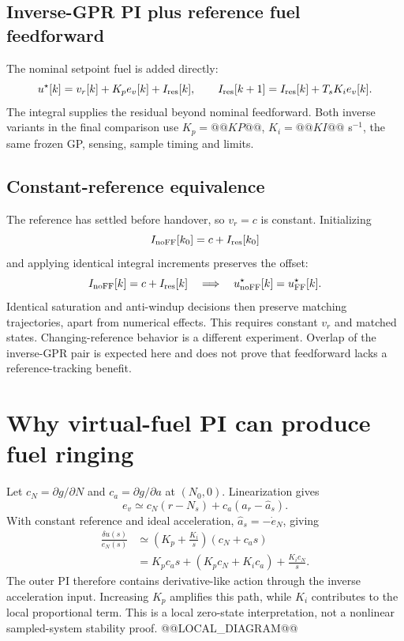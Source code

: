 \subsection{Inverse-GPR PI plus reference fuel feedforward}
The nominal setpoint fuel is added directly:
\begin{equation}
u^\star[k]=v_r[k]+K_pe_v[k]+I_{\rm res}[k],\qquad
I_{\rm res}[k+1]=I_{\rm res}[k]+T_sK_ie_v[k].
\label{eq:invff}
\end{equation}
The integral supplies the residual beyond nominal feedforward. Both inverse variants in the final comparison use $K_p=@@KP@@$, $K_i=@@KI@@$ s$^{-1}$, the same frozen GP, sensing, sample timing and limits.

\subsection{Constant-reference equivalence}
The reference has settled before handover, so $v_r=c$ is constant. Initializing
\begin{equation}I_{\rm noFF}[k_0]=c+I_{\rm res}[k_0]\end{equation}
and applying identical integral increments preserves the offset:
\begin{equation}
I_{\rm noFF}[k]=c+I_{\rm res}[k]\quad\Longrightarrow\quad
u^\star_{\rm noFF}[k]=u^\star_{\rm FF}[k].
\label{eq:equivalence}
\end{equation}
Identical saturation and anti-windup decisions then preserve matching trajectories, apart from numerical effects. This requires constant $v_r$ and matched states. Changing-reference behavior is a different experiment. Overlap of the inverse-GPR pair is expected here and does not prove that feedforward lacks a reference-tracking benefit.

\section{Why virtual-fuel PI can produce fuel ringing}
Let $c_N=\partial g/\partial N$ and $c_a=\partial g/\partial a$ at $(N_0,0)$. Linearization gives
\begin{equation}e_v\simeq c_N(r-N_s)+c_a(a_r-\hat a_s).\end{equation}
With constant reference and ideal acceleration, $\hat a_s=-\dot e_N$, giving
\begin{align}
\frac{\delta u(s)}{e_N(s)}
&\simeq\left(K_p+\frac{K_i}{s}\right)(c_N+c_as)\\
&=K_pc_as+(K_pc_N+K_ic_a)+\frac{K_ic_N}{s}.
\label{eq:localpid}
\end{align}
The outer PI therefore contains derivative-like action through the inverse acceleration input. Increasing $K_p$ amplifies this path, while $K_i$ contributes to the local proportional term. This is a local zero-state interpretation, not a nonlinear sampled-system stability proof.
@@LOCAL_DIAGRAM@@

